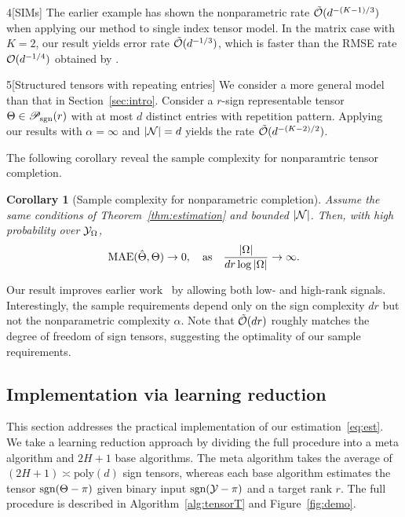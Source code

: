 \documentclass{article}
\theoremstyle{plain}
\newtheorem{cor}{Corollary}
\theoremstyle{definition}
\def\sign{\textup{sgn}}
\def\caliP{\mathscr{P}_{\textup{sgn}}}
\begin{document}
\begin{customexample}{4}[SIMs]
The earlier example has shown the nonparametric rate $\tilde {\mathcal{O}}(d^{-(K-1)/3})$ when applying our method to single index tensor model. In the matrix case with $K=2$, our result yields error rate $\tilde {\mathcal{O}}(d^{-1/3})$, which is faster than the RMSE rate $\mathcal{O}(d^{-1/4})$ obtained by \cite{ganti2015matrix}. 
\end{customexample}
\vspace{.05cm}

\begin{customexample}{5}[Structured tensors with repeating entries]
We consider a more general model than that in Section~\ref{sec:intro}. Consider a $r$-sign representable tensor $\Theta\in \caliP(r)$ with at most $d$ distinct entries with repetition pattern. Applying our results with $\alpha=\infty$ and $|\mathcal{N}|=d$ yields the rate $\tilde {\mathcal{O}}(d^{-(K-2)/2})$. 
\end{customexample}

The following corollary reveal the sample complexity for nonparamtric tensor completion. 
\begin{cor}[Sample complexity for nonparametric completion] Assume the same conditions of Theorem~\ref{thm:estimation} and bounded $|\mathcal{N}|$. Then, with high probability over $\mathcal{Y}_\Omega$, 
\[
\textup{MAE}(\hat \Theta, \Theta)\to 0, \quad \text{as}\quad {|\Omega|\over {dr} \log |\Omega|}\to \infty.
\]
\end{cor}
\vspace{-.2cm}
Our result improves earlier work~\citep{yuan2016tensor,ghadermarzy2019near,pmlr-v119-lee20i} by allowing both low- and high-rank signals. Interestingly, the sample requirements depend only on the sign complexity $dr$ but not the nonparametric complexity $\alpha$. Note that $\tilde {\mathcal{O}}(dr)$ roughly matches the degree of freedom of sign tensors, suggesting the optimality of our sample requirements. 


\subsection{Implementation via learning reduction}
This section addresses the practical implementation of our estimation~\eqref{eq:est}. We take a learning reduction approach by dividing the full procedure into a meta algorithm and $2H+1$ base algorithms. The meta algorithm takes the average of $(2H+1)\asymp \text{poly}(d)$ sign tensors, whereas each base algorithm estimates the tensor $\sign(\Theta-\pi)$ given binary input $\sign(\tY-\pi)$ and a target rank $r$. The full procedure is described in Algorithm~\ref{alg:tensorT} and Figure~\ref{fig:demo}.
\end{document}
